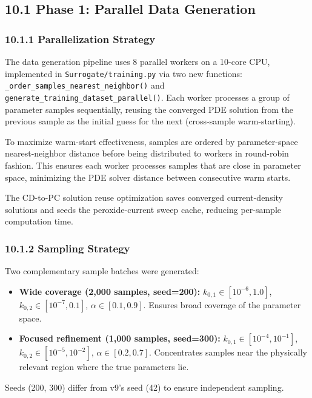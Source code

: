 \documentclass[11pt]{article}
\begin{document}
\subsection*{10.1 Phase 1: Parallel Data Generation}

\subsubsection*{10.1.1 Parallelization Strategy}

The data generation pipeline uses 8 parallel workers on a 10-core CPU,
implemented in \texttt{Surrogate/training.py} via two new functions:
\texttt{\_order\_samples\_nearest\_neighbor()} and
\texttt{generate\_training\_dataset\_parallel()}.  Each worker processes
a group of parameter samples sequentially, reusing the converged PDE
solution from the previous sample as the initial guess for the next
(cross-sample warm-starting).

To maximize warm-start effectiveness, samples are ordered by
parameter-space nearest-neighbor distance before being distributed to
workers in round-robin fashion.  This ensures each worker processes
samples that are close in parameter space, minimizing the PDE solver
distance between consecutive warm starts.

The CD-to-PC solution reuse optimization saves converged current-density
solutions and seeds the peroxide-current sweep cache, reducing
per-sample computation time.

\subsubsection*{10.1.2 Sampling Strategy}

Two complementary sample batches were generated:
\begin{itemize}
  \item \textbf{Wide coverage (2{,}000 samples, seed=200):}
        $k_{0,1} \in [10^{-6}, 1.0]$,
        $k_{0,2} \in [10^{-7}, 0.1]$,
        $\alpha \in [0.1, 0.9]$.
        Ensures broad coverage of the parameter space.
  \item \textbf{Focused refinement (1{,}000 samples, seed=300):}
        $k_{0,1} \in [10^{-4}, 10^{-1}]$,
        $k_{0,2} \in [10^{-5}, 10^{-2}]$,
        $\alpha \in [0.2, 0.7]$.
        Concentrates samples near the physically relevant region where
        the true parameters lie.
\end{itemize}

Seeds (200, 300) differ from v9's seed (42) to ensure independent sampling.
\end{document}
